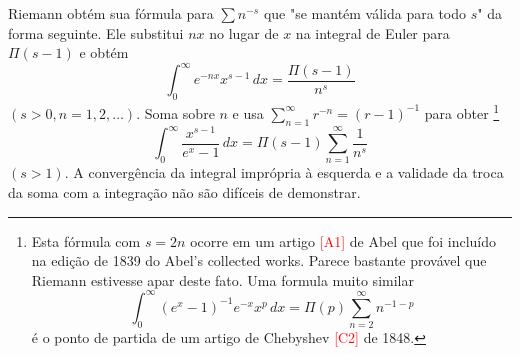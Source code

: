     Riemann obtém sua fórmula para $\sum n^{-s}$ que "se mantém válida para todo $s$" da forma seguinte. Ele substitui $nx$ no lugar de $x$ na integral de Euler para $\Pi(s-1)$ e obtém 
    \begin{equation*}
        \int_{0}^{\infty}e^{-nx}x^{s-1} \, dx = \frac{\Pi(s-1)}{n^s}
    \end{equation*}
    $(s > 0, n = 1, 2, \dots)$. Soma sobre $n$ e usa $\sum_{n=1}^{\infty} r^{-n} = (r-1)^{-1}$ para obter 
    \footnote{
    Esta fórmula com $s=2n$ ocorre em um artigo \textcolor{red}{[A1]} de Abel que foi incluído na edição de 1839 do Abel's collected works. Parece bastante provável que Riemann estivesse apar deste fato. Uma formula muito similar
    $$\int_0^{\infty} (e^x-1)^{-1}e^{-x}x^p \, dx = \Pi(p)\sum_{n=2}^{\infty} n^{-1-p} $$
    é o ponto de partida de um artigo de Chebyshev \textcolor{red}{[C2]} de 1848.
    }
    \begin{equation}
        \label{int-zeta-Pi}
        \int_0^{\infty} \frac{x^{s-1}}{e^{x} - 1} \, dx = \Pi(s-1)\sum_{n=1}^{\infty}\frac{1}{n^s}
    \end{equation}
    $(s > 1)$. A convergência da integral imprópria à esquerda e a validade da troca da soma com a integração não são difíceis de demonstrar. 
    
